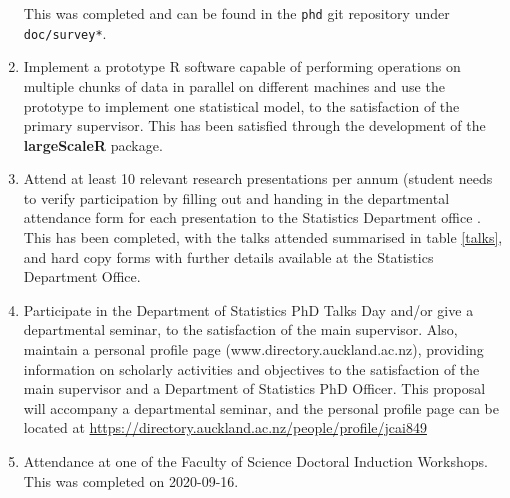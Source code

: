 \begin{enumerate}
                This was completed and can be found in the \texttt{phd} git repository under \texttt{doc/survey*}.
        \item Implement a prototype R software capable of performing operations on multiple chunks of data in parallel on different machines and use the prototype to implement one statistical model, to the satisfaction of the primary     supervisor.
                This has been satisfied through the development of the \textbf{largeScaleR} package.
        \item Attend at least 10 relevant research presentations per annum (student needs to verify participation by filling out and handing in the departmental attendance form for each presentation to the Statistics Department office    .
                This has been completed, with the talks attended summarised in table \ref{talks}, and hard copy forms with further details available at the Statistics Department Office.
        \item Participate in the Department of Statistics PhD Talks Day and/or give a departmental seminar, to the satisfaction of the main supervisor.
                Also, maintain a personal profile page (www.directory.auckland.ac.nz), providing information on scholarly activities and objectives to the satisfaction of the main supervisor and a Department of Statistics PhD Officer.
                This proposal will accompany a departmental seminar, and the personal profile page can be located at \url{https://directory.auckland.ac.nz/people/profile/jcai849}
        \item Attendance at one of the Faculty of Science Doctoral Induction Workshops.
                This was completed  on 2020-09-16.
\end{enumerate}


